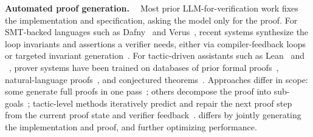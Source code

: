 \textbf{Automated proof generation. \ }
Most prior LLM-for-verification work fixes the implementation and specification, asking the model only for the proof.
For SMT-backed languages such as Dafny~\cite{dafny} and Verus~\cite{verus}, recent systems synthesize the loop invariants and assertions a verifier needs, either via compiler-feedback loops~\cite{autoverus} or targeted invariant generation~\cite{laurel}.
% 
For tactic-driven assistants such as Lean~\cite{lean} and \coq{}~\cite{coq}, prover systems have been trained on databases of prior formal proofs~\cite{coqgym}, natural-language proofs~\cite{wang2024theoremllama}, and conjectured theorems~\cite{dong2025stp}.
Approaches differ in scope: some generate full proofs in one pass~\cite{deepseek-prover-v2,kimina-prover,baldur}; others decompose the proof into sub-goals~\cite{li2026goedel,zhao2024subgoalxl,dsp}; tactic-level methods iteratively predict and repair the next proof step from the current proof state and verifier feedback~\cite{hubert2025olympiad,leandojo,copra,apollo,ruida2025ma}.
\sys{} differs by jointly generating the implementation and proof, and further optimizing performance.


